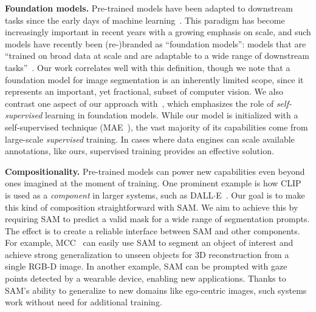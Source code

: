 \documentclass[10pt,twocolumn,letterpaper]{article}
\renewcommand{\paragraph}[1]{\vspace{1.25mm}\noindent\textbf{#1}}
\newcommand{\sam}{SAM\xspace}
\begin{document}
\paragraph{Foundation models.} Pre-trained models have been adapted to downstream tasks since the early days of machine learning~\cite{thrun1995learning}. This paradigm has become increasingly important in recent years with a growing emphasis on scale, and such models have recently been (re-)branded as ``foundation models'': \ie models that are ``trained on broad data at scale and are adaptable to a wide range of downstream tasks''~\cite{bommasani2021opportunities}. Our work correlates well with this definition, though we note that a foundation model for image segmentation is an inherently limited scope, since it represents an important, yet fractional, subset of computer vision. We also contrast one aspect of our approach with~\cite{bommasani2021opportunities}, which emphasizes the role of \emph{self-supervised} learning in foundation models. While our model is initialized with a self-supervised technique (MAE~\cite{he2022masked}), the vast majority of its capabilities come from large-scale \emph{supervised} training. In cases where data engines can scale available annotations, like ours, supervised training provides an effective solution.

\paragraph{Compositionality.} Pre-trained models can power new capabilities even beyond ones imagined at the moment of training. One prominent example is how CLIP~\cite{Radford2021} is used as a \emph{component} in larger systems, such as DALL$\cdot$E~\cite{Ramesh2021}. Our goal is to make this kind of composition straightforward with \sam. We aim to achieve this by requiring \sam to predict a valid mask for a wide range of segmentation prompts. The effect is to create a reliable interface between \sam and other components. For example, MCC~\cite{wu2023multiview} can easily use \sam to segment an object of interest and achieve strong generalization to unseen objects for 3D reconstruction from a single RGB-D image. In another example, \sam can be prompted with gaze points detected by a wearable device, enabling new applications. Thanks to \sam's ability to generalize to new domains like ego-centric images, such systems work without need for additional training.
\end{document}

